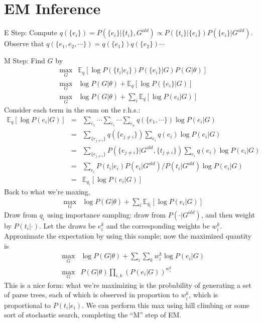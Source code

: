 \documentclass[12pt]{article}
\begin{document}
\section{EM Inference}
E Step: Compute $q(\{e_i\})=P(\{e_i\} | \{t_i\},G^{old})\propto P(\{t_i\}|\{e_i\})P(\{e_i\}|G^{old})$.
Observe that $q(\{e_1,e_2,\cdots\})=q(\{e_1\})q(\{e_2\})\cdots$

M Step: Find $G$ by
\begin{eqnarray*}
&\max_G& \mathbb{E}_q \left[ \log P(\{t_i|e_i\}) P(\{e_i\}|G)P(G|\theta) \right]\\
&\max_G& \log P(G|\theta) + \mathbb{E}_q \left[ \log P(\{e_i\}|G)\right] \\ 
&\max_G& \log P(G|\theta) + \sum_i \mathbb{E}_q \left[ \log P(e_i | G) \right]
\end{eqnarray*}
Consider each term in the sum on the r.h.s.:
\begin{eqnarray*}
\mathbb{E}_q \left[ \log P(e_i | G) \right] &=& \sum_{e_1}\cdots\sum_{e_i}\cdots \sum_{e_n} q(\{e_1,\cdots\})\log P(e_i|G)\\
&=& \sum_{\{e_{j\not=i}\}} q(\{e_{j\not= i}\})\sum_{e_i}q(e_i)\log P(e_i|G)\\
&=& \sum_{\{e_{j\not=i}\}} P(\{e_{j\not= i}\}|G^{old}, \{t_{j\not= i}\})\sum_{e_i}q(e_i)\log P(e_i|G)\\
&=& \sum_{e_i}  P(t_i|e_i)P(e_i|G^{old})/P(t_i|G^{old}) \log P(e_i|G)\\
&=& \mathbb{E}_{q_i} \left[ \log P(e_i|G) \right]
\end{eqnarray*}
Back to what we're maxing,
\begin{eqnarray*}
&\max_G& \log P(G|\theta) + \sum_i \mathbb{E}_{q_i} \left[ \log P(e_i|G) \right]
\end{eqnarray*}
Draw from $q_i$ using importance sampling: draw from $P(\cdot | G^{old})$, and then weight by $P(t_i | \cdot)$.
Let the draws be $e_i^k$ and the corresponding weights be $w_i^k$.
Approximate the expectation by using this sample; now the maximized quantity is
\begin{eqnarray*}
&\max_G& \log P(G|\theta) + \sum_i \sum_k w_i^k \log P(e_i|G)\\
&\max_G& P(G|\theta) \prod_{i,k}  \left( P(e_i|G) \right)^{w_i^k}
\end{eqnarray*}
This is a nice form: what we're maximizing is the probability of generating a set of parse trees, each of which is observed in proportion to $w_i^k$, which is proportional to $P(t_i|e_i)$.
We can perform this max using hill climbing or some sort of stochastic search, completing the ``M'' step of EM.
\end{document}
